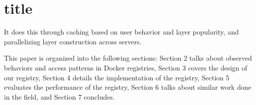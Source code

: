 \part{title}It does this through caching based on user behavior and layer popularity, and parallelizing layer construction across servers.

This paper is organized into the following sections: Section 2 talks about observed behaviors and access patterns in Docker registries, Section 3 covers the design of our registry, Section 4 details the implementation of the registry, Section 5 evaluates the performance of the registry, Section 6 talks about similar work done in the field, and Section 7 concludes. 

  
